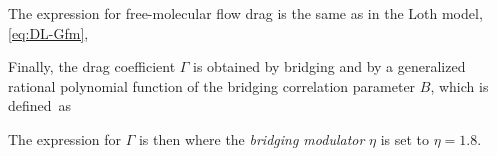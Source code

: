     The expression for free-molecular flow drag is the same as in the Loth model, \cref{eq:DL-Gfm},

    Finally, the drag coefficient $\Gamma$ is obtained by bridging  and 
    by a generalized rational polynomial function of the bridging correlation parameter $B$,
    which is defined~as

    The expression for $\Gamma$ is then
    where the \emph{bridging modulator} $\eta$ is set to $\eta = \num{1.8}$.
